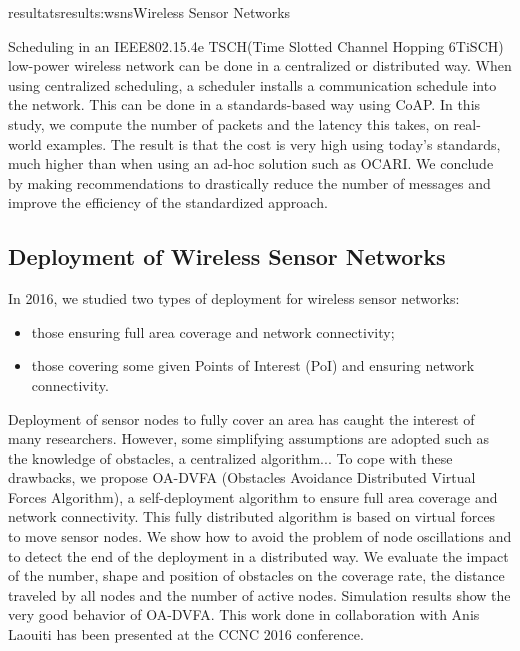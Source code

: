 \documentclass{ra2016}
\begin{document}
\begin{module}{resultats}{results:wsns}{Wireless Sensor Networks}
\begin{participants}
\end{participants}

Scheduling in an IEEE802.15.4e TSCH(Time Slotted Channel Hopping 6TiSCH) low-power wireless network can be done in a centralized or distributed way. 
When using centralized scheduling, a scheduler installs a communication schedule into the network.
This can be done in a standards-based way using CoAP.
In this study, we compute the number of packets and the latency this takes, on real-world examples.
The result is that the cost is very high using today's standards, much higher than when using an ad-hoc solution such as OCARI.
We conclude by making recommendations to drastically reduce the number of messages and improve the efficiency of the standardized approach.

\subsection{Deployment of Wireless Sensor Networks}

\begin{participants}
\end{participants}

In 2016, we studied two types of deployment for wireless sensor networks:

\begin{itemize}
    \item those ensuring full area coverage and network connectivity;
    \item those covering some given Points of Interest (PoI) and ensuring network connectivity.\\
\end{itemize}

Deployment of sensor nodes to fully cover an area has caught the interest of many researchers.
However, some simplifying assumptions are adopted such as the knowledge of obstacles, a centralized algorithm...
To cope with these drawbacks, we propose OA-DVFA (Obstacles Avoidance Distributed Virtual Forces Algorithm), a self-deployment algorithm to ensure full area coverage and network connectivity.
This fully distributed algorithm is based on virtual forces to move sensor nodes.
We show how to avoid the problem of node oscillations and to detect the end of the deployment in a distributed way. 
We evaluate the impact of the number, shape and position of obstacles on the coverage rate, the distance traveled by all nodes and the number of active nodes.
Simulation results show the very good behavior of OA-DVFA.
This work done in collaboration with Anis Laouiti has been presented at the CCNC 2016 conference.


\end{module}
\end{document}
